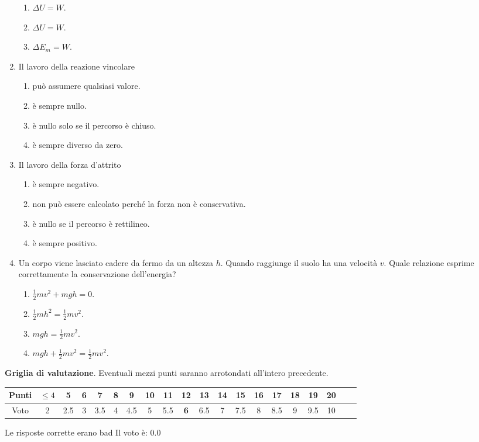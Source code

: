 \documentclass{article}
\begin{document}
\begin{enumerate}
\begin{enumerate}[label=\Alph*.]
    \item $\Delta U=W$.
    \item $\Delta U=W$.
    \item $\Delta E_m=W$.
  \end{enumerate}
  \item Il lavoro della reazione vincolare
  \begin{enumerate}[label=\Alph*.]
    \item può assumere qualsiasi valore.
    \item è sempre nullo.
    \item è nullo solo se il percorso è chiuso.
    \item è sempre diverso da zero.
  \end{enumerate}
  \item Il lavoro della forza d'attrito
  \begin{enumerate}[label=\Alph*.]
    \item è sempre negativo.
    \item non può essere calcolato perché la forza non è conservativa.
    \item è nullo se il percorso è rettilineo.
    \item è sempre positivo.
  \end{enumerate}
  \item Un corpo viene lasciato cadere da fermo da un altezza $h$. Quando raggiunge il suolo ha una velocità $v$. Quale relazione esprime correttamente la conservazione dell'energia?
  \begin{enumerate}[label=\Alph*.]
    \item $\frac{1}{2}mv^2+mgh=0.$
    \item $\frac{1}{2}mh^2=\frac{1}{2}mv^2$.
    \item $mgh=\frac{1}{2}mv^2$.
    \item $mgh+\frac{1}{2}mv^2=\frac{1}{2}mv^2.$
  \end{enumerate}
\end{enumerate}








\newpage \maketitle \centering \textbf{Griglia di valutazione}. Eventuali mezzi punti saranno arrotondati all'intero precedente. \begin{table}[h]     \centering \begin{tabular}{|c|c|c|c|c|c|c|c|c|c|c|c|c|c|c|c|c|c|c|c|} \hline Punti &  $\leq 4$ & 5 & 6 & 7 & 8 & 9 & 10 & 11 & \textbf{12} & 13 & 14 & 15 & 16 & 17 & 18 & 19 & 20 \\ \hline Voto & 2 & 2.5 & 3 & 3.5 & 4 & 4.5 & 5 & 5.5 & \textbf{6} & 6.5 & 7 & 7.5 & 8 & 8.5 & 9 & 9.5 & 10 \\ \hline \end{tabular} \end{table}
Le risposte corrette erano  bad
Il voto è:  0.0
\end{document}
